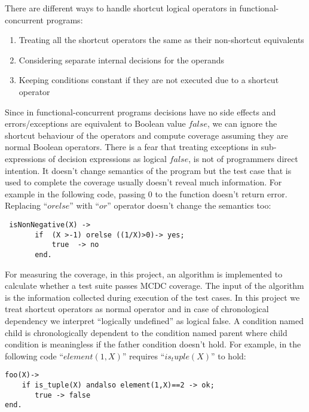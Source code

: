 \documentclass[12pt,a4paper]{report}
\begin{document}
There are different ways to handle shortcut logical operators in functional-concurrent programs:

\begin{enumerate}
 \item Treating all the shortcut operators the same as their non-shortcut equivalents
 \item Considering separate internal decisions for the operands\cite{DO-248B} 
 \item Keeping conditions constant if they are not executed due to a shortcut operator\cite{chilenski1994applicability}
\end{enumerate}
 
Since in functional-concurrent programs decisions have no side effects and errors/exceptions are equivalent to Boolean value $false$, we can ignore the
 shortcut behaviour of the operators and compute coverage assuming they are normal Boolean operators. There is a fear that treating exceptions in
 sub-expressions of decision expressions as logical $false$, is not of programmers direct intention. It doesn’t change semantics of the program but
 the test case that is used to complete the coverage usually doesn’t reveal much information. For example in the following code, passing $0$ to the
 function doesn’t return error. Replacing ``$orelse$'' with ``$or$'' operator doesn’t change the semantics too:

\begin{lstlisting}
 isNonNegative(X) -> 
       if  (X >-1) orelse ((1/X)>0)-> yes;
           true  -> no
       end.
\end{lstlisting} 
 
For measuring the coverage, in this project, an algorithm is implemented to calculate whether a test suite passes MCDC coverage. The input of the algorithm
 is the information collected during execution of the test cases. In this project we treat shortcut operators as normal operator and in case of
 chronological dependency we interpret “logically undefined” as logical false. A condition named child is chronologically dependent to the condition named
 parent where child condition is meaningless if the father condition doesn’t hold. For example, in the following code “$element(1,X)$” requires
 “$is_tuple(X)$” to hold:

\begin{lstlisting}
foo(X)->
    if is_tuple(X) andalso element(1,X)==2 -> ok;
       true -> false
end.
\end{lstlisting} 
\end{document}
